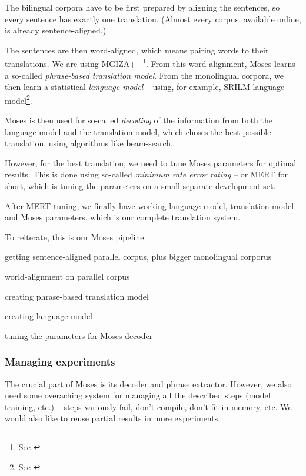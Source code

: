 The bilingual corpora have to be first prepared by aligning the sentences, so every sentence has exactly one translation. (Almost every corpus, available online, is already sentence-aligned.)

The sentences are then word-aligned, which means pairing words to their translations. We are using MGIZA++\footnote{See \cite{mgiza}}. From this word alignment, Moses learns a so-called \emph{phrase-based translation model}. From the monolingual corpora, we then learn a statistical \emph{language model} -- using, for example, SRILM language model\footnote{See \cite{srilm}}.

Moses is then used for so-called \emph{decoding} of the information from both the language model and the translation model, which choses the best possible translation, using algorithms like beam-search.

However, for the best translation, we need to tune Moses parameters for optimal results. This is done using so-called \emph{minimum rate error rating} -- or MERT for short, which is tuning the parameters on a small separate development set.



After MERT tuning, we finally have working language model, translation model and Moses parameters, which is our complete translation system.

To reiterate, this is our Moses pipeline
\begin{pitemize}
\item getting sentence-aligned parallel corpus, plus bigger monolingual corporus
\item world-alignment on parallel corpus
\item creating phrase-based translation model
\item creating language model
\item tuning the parameters for Moses decoder
\end{pitemize}


\subsubsection{Managing experiments}
The crucial part of Moses is its decoder and phrase extractor. However, we also need some overaching system for managing all the described steps (model training, etc.) -- steps variously fail, don't compile, don't fit in memory, etc. We would also like to reuse partial results in more experiments.

